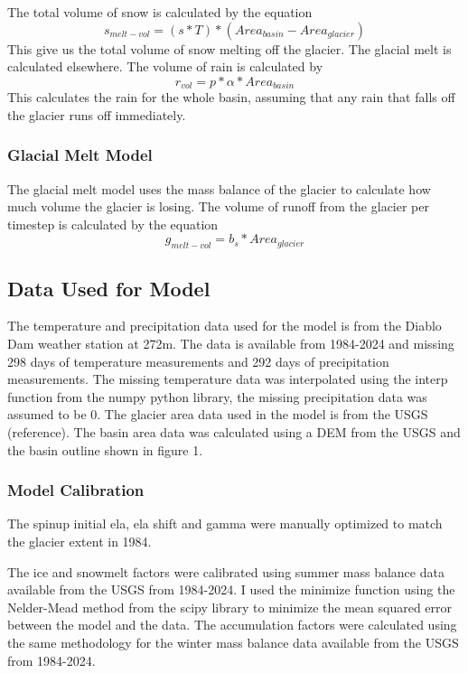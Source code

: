 \documentclass{article}
\begin{document}
The total volume of snow is calculated by the equation
\begin{equation}s_{melt-vol}=(s*T)*({Area}_{basin}-{Area}_{glacier})\end{equation}
This give us the total volume of snow melting off the glacier. The glacial melt is calculated elsewhere. The volume of rain is calculated by
\begin{equation}r_{vol}=p*\alpha*{Area}_{basin}\end{equation}
This calculates the rain for the whole basin, assuming that any rain that falls off the glacier runs off immediately.

\subsubsection{Glacial Melt Model}
The glacial melt model uses the mass balance of the glacier to calculate how much volume the glacier is losing. The volume of runoff from the 
glacier per timestep is calculated by the equation
\begin{equation}g_{melt-vol}=b_s*{Area}_{glacier}\end{equation}
\subsection{Data Used for Model}
The temperature and precipitation data used for the model is from the Diablo Dam weather station at 272m. The data is available from 1984-2024 
and missing 298 days of temperature measurements and 292 days of precipitation measurements. The missing temperature data was interpolated 
using the interp function from the numpy python library, the missing precipitation data was assumed to be 0. The glacier area data used in 
the model is from the USGS (reference). The basin area data was calculated using a DEM from the USGS and the basin outline shown in figure 1.

\subsubsection{Model Calibration}
The spinup initial ela, ela shift and gamma were manually optimized to match the glacier extent in 1984. 

The ice and snowmelt factors were calibrated using summer mass balance data available from the USGS from 1984-2024. I used the minimize 
function using the Nelder-Mead method from the scipy library to minimize the mean squared error between the model and the data. The 
accumulation factors were calculated using the same methodology for the winter mass balance data available from the USGS from 1984-2024.
\end{document}
